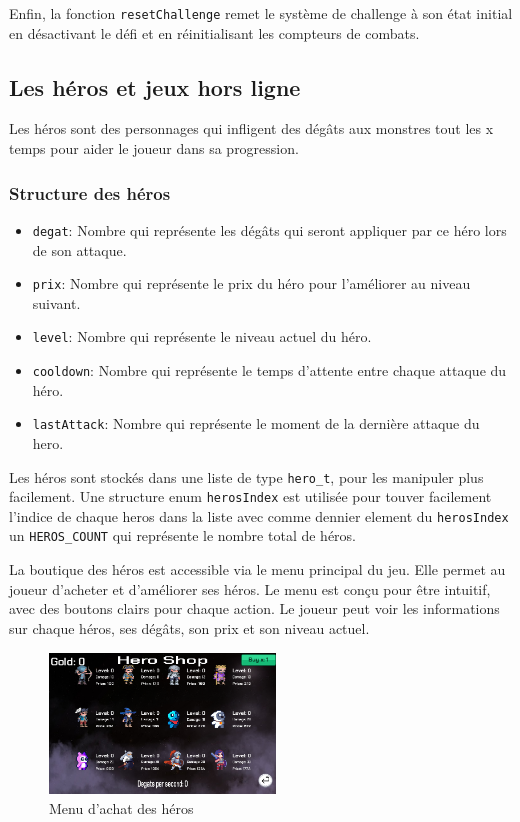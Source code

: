 \documentclass[11pt,a4paper]{article}
\begin{document}
Enfin, la fonction \texttt{resetChallenge} remet le système de challenge à son état initial en désactivant le défi et en réinitialisant les compteurs de combats.

\subsection {Les héros et jeux hors ligne}
Les héros sont des personnages qui infligent des dégâts 
aux monstres tout les x temps pour aider le joueur dans sa progression.

\subsubsection{Structure des héros}

\begin{itemize}
    \item \texttt{degat}: Nombre qui représente les dégâts qui seront appliquer par ce héro lors de son attaque.
    \item \texttt{prix}: Nombre qui représente le prix du héro pour l'améliorer au niveau suivant.
    \item \texttt{level}: Nombre qui représente le niveau actuel du héro.
    \item \texttt{cooldown}: Nombre qui représente le temps d'attente entre chaque attaque du héro.
    \item \texttt{lastAttack}: Nombre qui représente le moment de la dernière attaque du hero.
\end{itemize}

Les héros sont stockés dans une liste de type \texttt{hero\_t}, pour les manipuler plus facilement. Une structure enum \texttt{herosIndex} est 
utilisée pour touver facilement l'indice de chaque heros dans la liste avec comme dennier element du \texttt{herosIndex} 
un \texttt{HEROS\_COUNT} qui représente le nombre total de héros.


La boutique des héros est accessible via le menu principal du jeu. Elle permet au joueur d'acheter et d'améliorer ses héros. 
Le menu est conçu pour être intuitif, avec des boutons clairs pour chaque action. Le joueur peut voir les informations sur chaque héros, 
ses dégâts, son prix et son niveau actuel.
\begin{figure}[h] 
    \centering 
    \includegraphics[width=6cm]{img/MenuHeros.png} 
    \caption{Menu d'achat des héros}
\end{figure}
\end{document}
